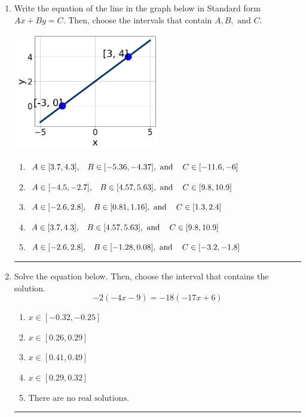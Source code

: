 \documentclass[14pt]{extbook}
\newcommand{\litem}[1]{\item#1\hspace*{-1cm}\rule{\textwidth}{0.4pt}}
\begin{document}
\begin{enumerate}
{\begin{enumerate}[label=\Alph*.]
\end{enumerate} }
\litem{
Write the equation of the line in the graph below in Standard form $Ax+By=C$. Then, choose the intervals that contain $A, B, \text{ and } C$.
\begin{center}
    \includegraphics[width=0.5\textwidth]{../Figures/linearGraphToStandardA.png}
\end{center}
\begin{enumerate}[label=\Alph*.]
\item \( A \in [3.7, 4.3], \hspace{3mm} B \in [-5.36, -4.37], \text{ and } \hspace{3mm} C \in [-11.6, -6] \)
\item \( A \in [-4.5, -2.7], \hspace{3mm} B \in [4.57, 5.63], \text{ and } \hspace{3mm} C \in [9.8, 10.9] \)
\item \( A \in [-2.6, 2.8], \hspace{3mm} B \in [0.81, 1.16], \text{ and } \hspace{3mm} C \in [1.3, 2.4] \)
\item \( A \in [3.7, 4.3], \hspace{3mm} B \in [4.57, 5.63], \text{ and } \hspace{3mm} C \in [9.8, 10.9] \)
\item \( A \in [-2.6, 2.8], \hspace{3mm} B \in [-1.28, 0.08], \text{ and } \hspace{3mm} C \in [-3.2, -1.8] \)

\end{enumerate} }
\litem{
Solve the equation below. Then, choose the interval that contains the solution.\[ -2(-4x -9) = -18(-17x + 6) \]\begin{enumerate}[label=\Alph*.]
\item \( x \in [-0.32, -0.25] \)
\item \( x \in [0.26, 0.29] \)
\item \( x \in [0.41, 0.49] \)
\item \( x \in [0.29, 0.32] \)
\item \( \text{There are no real solutions.} \)


\end{enumerate}}
\end{enumerate}
\end{document}
